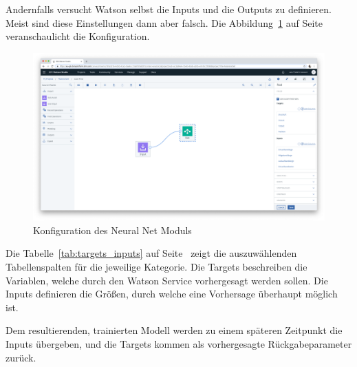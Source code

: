 Andernfalls versucht Watson selbst die Inputs und die Outputs zu definieren. Meist sind diese Einstellungen dann
aber falsch. Die Abbildung~\ref{fig:umsetzung_config_neural_net} auf Seite~\pageref{fig:umsetzung_config_neural_net}
veranschaulicht die Konfiguration.

\begin{figure}[h]
    \centering
    \includegraphics[width=\textwidth]{images/kapitel_3/umsetzung_config_neural_net.png}
    \caption{Konfiguration des Neural Net Moduls}
    \label{fig:umsetzung_config_neural_net}
\end{figure}

Die Tabelle~\ref{tab:targets_inputs} auf Seite~\pageref{tab:targets_inputs} zeigt die auszuwählenden Tabellenspalten für
die jeweilige Kategorie. Die Targets beschreiben die Variablen, welche durch den Watson Service vorhergesagt werden
sollen. Die Inputs definieren die Größen, durch welche eine Vorhersage überhaupt möglich ist.

Dem resultierenden, trainierten Modell werden zu einem späteren Zeitpunkt die Inputs übergeben, und die Targets kommen
als vorhergesagte Rückgabeparameter zurück.


